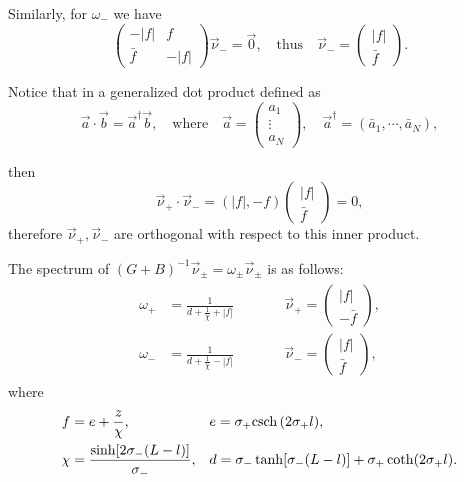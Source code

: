 Similarly, for $\omega_-$ we have
% 
\[
  \begin{pmatrix} -|f|&f\\ \bar{f}&-|f|\end{pmatrix}\vec{\nu}_- = \vec{0},\quad\text{thus}\quad \vec{\nu}_ -= \begin{pmatrix}|f|\\ \bar{f} \end{pmatrix}.
\]
% 

Notice that in a generalized dot product defined as
% 
\[
  \vec{a}\cdot \vec{b} = \vec{a}^\dagger\vec{b},\quad\text{where}\quad\vec{a}=\begin{pmatrix}a_1\\ \vdots \\ a_N\end{pmatrix},\quad\vec{a}^\dagger=(\bar{a}_1, \cdots, \bar{a}_N),
\]
% 

then
% 
\[
  \vec{\nu}_+\cdot \vec{\nu}_- = (|f|,-f)\begin{pmatrix}|f|\\ \bar{f}\end{pmatrix} = 0,
\]
% 
therefore $\vec{\nu}_+,\vec{\nu}_-$ are orthogonal with respect to this inner product.

\begin{lemma}
  The spectrum of $(G+B)^{-1}\vec{\nu}_{\pm} = \omega_{\pm}\vec{\nu}_{\pm}$ is as follows:
% 
\begin{equation}
\label{eqn:spect}
	\begin{split}
	\begin{aligned}
	  \omega_+&=\frac{1}{d+\frac{1}{\chi}+|f|} &&\qquad \vec{\nu}_+=\begin{pmatrix}|f|\\ -\bar{f}\end{pmatrix},\\
	  \omega_-&=\frac{1}{d+\frac{1}{\chi}-|f|} &&\qquad \vec{\nu}_-=\begin{pmatrix}|f|\\ \bar{f}\end{pmatrix},
	\end{aligned}
	\end{split}
\end{equation}
%
where
% 
\begin{equation*}
	\begin{split}
	\begin{aligned}
	  f&=e+\frac{z}{\chi}, &&e = \sigma_+\mathrm{csch} \,(2\sigma_+l),\\
	  \chi&=\frac{\sinh[2\sigma_-(L-l)]}{\sigma_-}, &&d = \sigma_-\tanh[\sigma_-(L-l)]+\sigma_+\coth(2\sigma_+l).
	\end{aligned}
	\end{split}
\end{equation*}
%
\end{lemma}

